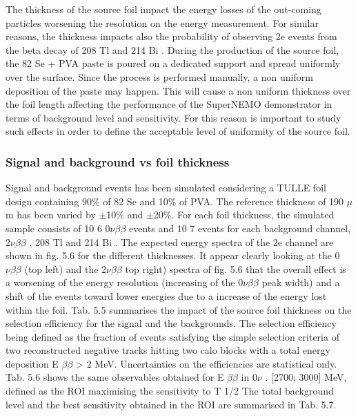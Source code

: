\documentclass[main.tex]{subfiles}
\begin{document}
\NI The thickness of the source foil impact the energy losses of the out-coming particles worsening the resolution on the energy measurement. For similar reasons, the thickness impacts also the probability of observing 2e events from the beta decay of 208 Tl and 214 Bi . During the production of the source foil, the 82 Se + PVA paste is poured on a dedicated support and spread uniformly over the surface. Since the process is performed manually, a non uniform deposition of the paste may happen. This will cause a non uniform thickness over the foil length affecting the performance of the SuperNEMO demonstrator in terms of background level and sensitivity. For this reason is important to study such effects in order to define the acceptable level of uniformity of the source foil.


\subsubsection{Signal and background vs foil thickness}


\NI Signal and background events has been simulated considering a TULLE foil design containing 90\% of 82 Se and 10\% of PVA. The reference thickness of 190 $\mu$m has been varied by $\pm$10\% and $\pm$20\%. For each foil thickness, the simulated sample consists of 10 6 0$\nu\beta\beta$ events and 10 7 events for each background channel, 2$\nu\beta\beta$ , 208 Tl and 214 Bi . The expected energy spectra of the 2e  channel are shown in fig. 5.6 for the different thicknesses. It appear clearly looking at the 0$\nu\beta\beta$ (top left) and the 2$\nu\beta\beta$ top right) spectra of fig. 5.6 that the overall effect is a worsening of the energy resolution (increasing of the 0$\nu\beta\beta$ peak width) and a shift of the events toward lower energies due to a increase of the energy lost within the foil. Tab. 5.5 summarises the impact of the source foil thickness on the selection efficiency for the signal and the backgrounds. The selection efficiency being defined as the fraction of events satisfying the simple selection criteria of two reconstructed negative tracks hitting two calo blocks with a total energy deposition E $\beta\beta$ > 2 MeV. Uncertainties on the efficiencies are statistical only. Tab. 5.6 shows the same observables obtained for E $\beta\beta$ in 0$\nu$ . [2700; 3000] MeV, defined as the ROI maximising the sensitivity to T 1/2 The total background level and the best sensitivity obtained in the ROI are summarised in Tab. 5.7.
\end{document}
